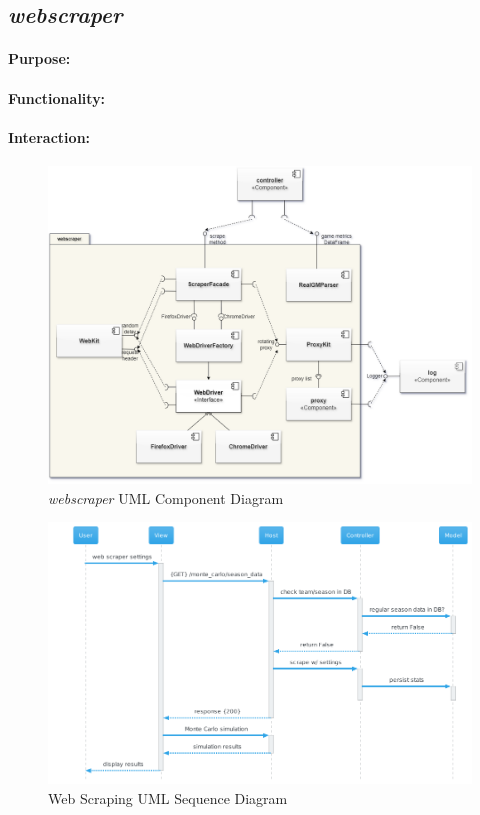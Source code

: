 \documentclass{thesis-ekf}
\theoremstyle{definition}
\theoremstyle{remark}
\begin{document}
{\subsection{\emph{webscraper}}
\paragraph{Purpose:}


\paragraph{Functionality:}


\paragraph{Interaction:}

\begin{figure}[th!]
	\centering
	\includegraphics[width=0.7\linewidth]{img/component/component_webscraper}
	\caption{\emph{webscraper} UML Component Diagram}
	\label{img-webscraper-component}
\end{figure}

\begin{figure}[th!]
	\centering
	\includegraphics[width=0.85\linewidth]{img/sequence/scraping/scraping_caerilian}
	\caption{Web Scraping UML Sequence Diagram}
	\label{img-scraping-sequence}
\end{figure}

}
\end{document}
